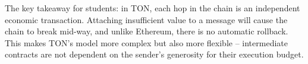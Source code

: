 The key takeaway for students: in TON, each hop in the chain is an independent
economic transaction. Attaching insufficient value to a message will cause the
chain to break mid-way, and unlike Ethereum, there is no automatic rollback.
This makes TON's model more complex but also more flexible -- intermediate
contracts are not dependent on the sender's generosity for their execution
budget.